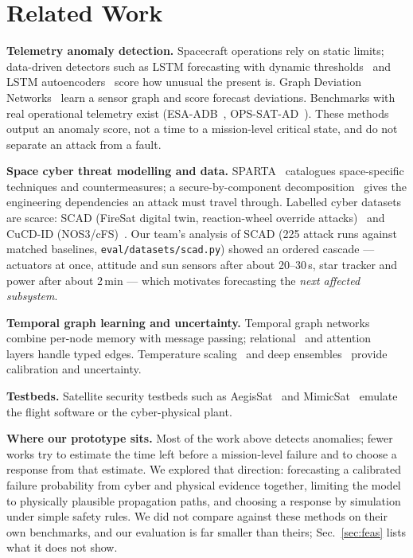 \documentclass[conference]{IEEEtran}
\newcommand{\file}[1]{\texttt{#1}}
\begin{document}
\section{Related Work}
\label{sec:related}

\textbf{Telemetry anomaly detection.} Spacecraft operations rely on static limits; data-driven
detectors such as LSTM forecasting with dynamic thresholds~\cite{hundman2018telemanom} and LSTM
autoencoders~\cite{malhotra2016lstmed} score how unusual the present is. Graph Deviation
Networks~\cite{deng2021gdn} learn a sensor graph and score forecast deviations. Benchmarks with real
operational telemetry exist (ESA-ADB~\cite{esaadb}, OPS-SAT-AD~\cite{opssatad}). These methods output
an anomaly score, not a time to a mission-level critical state, and do not separate an attack from a
fault.

\textbf{Space cyber threat modelling and data.} SPARTA~\cite{sparta} catalogues space-specific
techniques and countermeasures; a secure-by-component decomposition~\cite{benyahia2024} gives the
engineering dependencies an attack must travel through. Labelled cyber datasets are scarce: SCAD
(FireSat digital twin, reaction-wheel override attacks)~\cite{scad} and CuCD-ID (NOS3/cFS)~\cite{cucdid}.
Our team's analysis of SCAD (225 attack runs against matched baselines, \file{eval/datasets/scad.py})
showed an ordered cascade --- actuators at once, attitude and sun sensors after about 20--30\,s, star
tracker and power after about 2\,min --- which motivates forecasting the \emph{next affected
subsystem}.

\textbf{Temporal graph learning and uncertainty.} Temporal graph networks~\cite{rossi2020tgn} combine
per-node memory with message passing; relational~\cite{schlichtkrull2018rgcn} and
attention~\cite{velickovic2018gat} layers handle typed edges. Temperature scaling~\cite{guo2017calibration}
and deep ensembles~\cite{lakshminarayanan2017ensembles} provide calibration and uncertainty.

\textbf{Testbeds.} Satellite security testbeds such as AegisSat~\cite{aegissat} and
MimicSat~\cite{mimicsat} emulate the flight software or the cyber-physical plant.

\textbf{Where our prototype sits.} Most of the work above detects anomalies; fewer works try to
estimate the time left before a mission-level failure and to choose a response from that estimate. We
explored that direction: forecasting a calibrated failure probability from cyber and physical evidence
together, limiting the model to physically plausible propagation paths, and choosing a response by
simulation under simple safety rules. We did not compare against these methods on their own
benchmarks, and our evaluation is far smaller than theirs; Sec.~\ref{sec:feas} lists what it does
not show.
\end{document}
